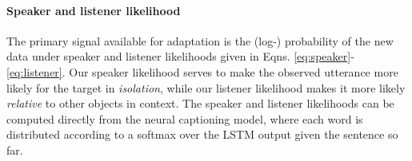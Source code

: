 \paragraph{Speaker and listener likelihood} 
The primary signal available for adaptation is the (log-) probability of the new data under speaker and listener likelihoods given in Eqns. \ref{eq:speaker}-\ref{eq:listener}.
Our speaker likelihood serves to make the observed utterance more likely for the target in \emph{isolation}, while our listener likelihood makes it more likely \emph{relative} to other objects in context. %
The speaker and listener likelihoods can be computed directly from the neural captioning model, where each word is distributed according to a softmax over the LSTM output given the sentence so far.
%

